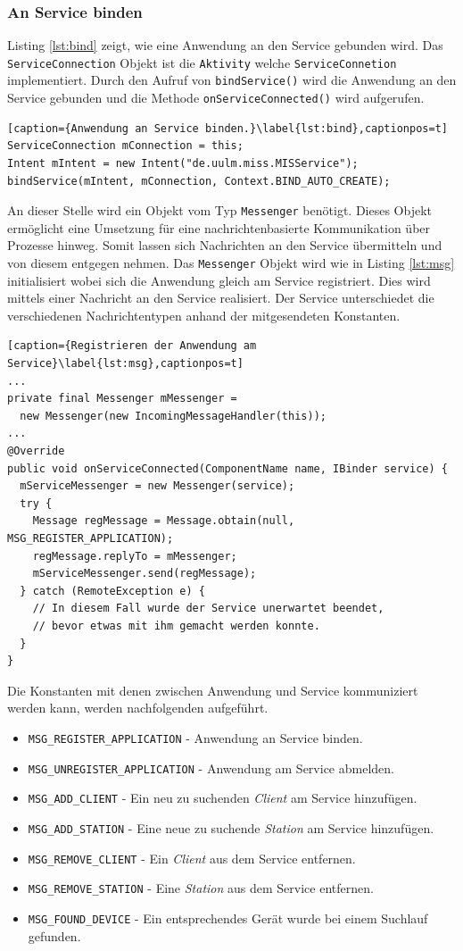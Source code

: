 \documentclass[]{report}
\begin{document}
\subsubsection{An Service binden}
Listing \ref{lst:bind}  zeigt, wie eine Anwendung an den Service gebunden wird. Das \texttt{ServiceConnection} Objekt ist die \texttt{Aktivity} welche \texttt{ServiceConnetion} implementiert. Durch den Aufruf von \texttt{bindService()} wird die Anwendung an den Service gebunden und die Methode \texttt{onServiceConnected()} wird aufgerufen. 
\begin{lstlisting}[caption={Anwendung an Service binden.}\label{lst:bind},captionpos=t] 
ServiceConnection mConnection = this;
Intent mIntent = new Intent("de.uulm.miss.MISService");
bindService(mIntent, mConnection, Context.BIND_AUTO_CREATE);
\end{lstlisting}
An dieser Stelle wird ein Objekt vom Typ \texttt{Messenger} benötigt. Dieses Objekt ermöglicht eine Umsetzung für eine nachrichtenbasierte Kommunikation über Prozesse hinweg. Somit lassen sich Nachrichten an den Service übermitteln und von diesem entgegen nehmen. Das \texttt{Messenger} Objekt wird wie in Listing \ref{lst:msg} initialisiert wobei sich die Anwendung gleich am Service registriert. Dies wird mittels einer Nachricht an den Service realisiert. Der Service unterschiedet die verschiedenen Nachrichtentypen anhand der mitgesendeten Konstanten.
\begin{lstlisting}[caption={Registrieren der Anwendung am Service}\label{lst:msg},captionpos=t] 
...
private final Messenger mMessenger = 
  new Messenger(new IncomingMessageHandler(this));
...
@Override
public void onServiceConnected(ComponentName name, IBinder service) {
  mServiceMessenger = new Messenger(service);
  try {
    Message regMessage = Message.obtain(null, MSG_REGISTER_APPLICATION);
    regMessage.replyTo = mMessenger;
    mServiceMessenger.send(regMessage);
  } catch (RemoteException e) {
 	// In diesem Fall wurde der Service unerwartet beendet,
 	// bevor etwas mit ihm gemacht werden konnte.
  }
}
\end{lstlisting}
 Die Konstanten mit denen zwischen Anwendung und Service kommuniziert werden kann, werden nachfolgenden aufgeführt.
\begin{itemize}
\item \texttt{MSG\_REGISTER\_APPLICATION} - Anwendung an Service binden.
\item \texttt{MSG\_UNREGISTER\_APPLICATION} - Anwendung am Service abmelden.
\item \texttt{MSG\_ADD\_CLIENT} - Ein neu zu suchenden \textit{Client} am Service hinzufügen.
\item \texttt{MSG\_ADD\_STATION} - Eine neue zu suchende \textit{Station} am Service hinzufügen. 
\item \texttt{MSG\_REMOVE\_CLIENT} - Ein \textit{Client} aus dem Service entfernen.
\item \texttt{MSG\_REMOVE\_STATION} - Eine \textit{Station} aus dem Service entfernen.
\item \texttt{MSG\_FOUND\_DEVICE} - Ein entsprechendes Gerät wurde bei einem Suchlauf gefunden. 
 \end{itemize}
\end{document}
